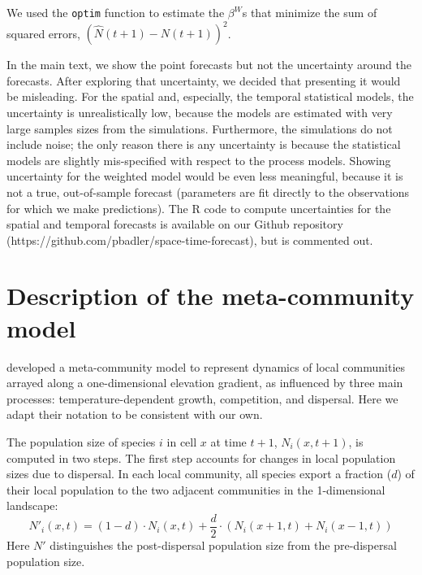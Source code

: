 \documentclass[11pt]{article}
\begin{document}
We used the \texttt{optim} function to estimate the $\beta^W$s that minimize the sum of squared errors, $(\hat{N}(t+1) - N(t+1))^2$.

In the main text, we show the point forecasts but not the uncertainty around the forecasts. After exploring that uncertainty, we decided that presenting it would be misleading. For the spatial and, especially, the temporal statistical models, the uncertainty is unrealistically low, because the models are estimated with very large samples sizes from the simulations. Furthermore, the simulations do not include noise; the only reason there is any uncertainty is because the statistical models are slightly mis-specified with respect to the process models. Showing uncertainty for the weighted model would be even less meaningful, because it is not a true, out-of-sample forecast (parameters are fit directly to the observations for which we make predictions). The R code to compute uncertainties for the spatial and temporal forecasts is available on our Github repository (https://github.com/pbadler/space-time-forecast), but is commented out.

\section{Description of the meta-community model}\label{metacomm}

\cite{alexander_lags_2018} developed a meta-community model to represent dynamics of local communities arrayed along a one-dimensional elevation gradient, as influenced by three main processes: temperature-dependent growth, competition, and dispersal. Here we adapt their notation to be consistent with our own.

The population size of species $i$ in cell $x$ at time $t + 1$, $N_{i}(x,t+1)$, is computed in two steps. The first step accounts for changes in local population sizes due to dispersal. In each local community, all species export a fraction ($d$) of their local population to the two adjacent communities in the 1-dimensional landscape:
\begin{equation}
N'_{i}(x,t) = (1-d) \cdot N_{i}(x,t) + \frac{d}{2} \cdot (N_{i}(x+1,t) + N_{i}(x-1,t))
\end{equation}
Here $N'$ distinguishes the post-dispersal population size from the pre-dispersal population size.
\end{document}
